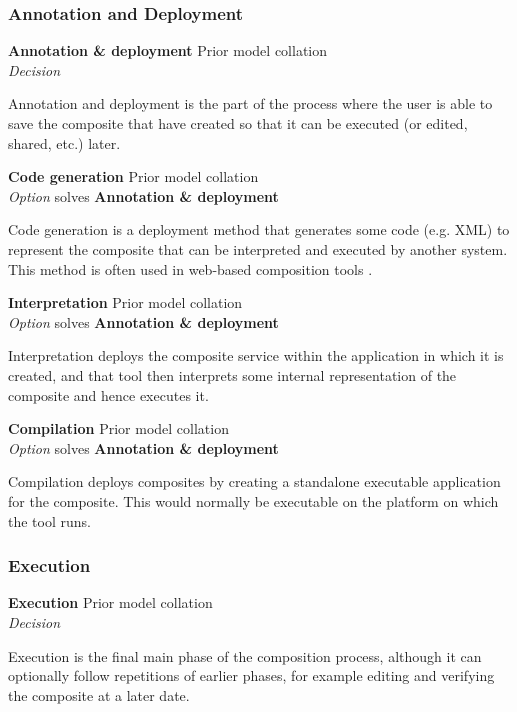 \subsubsection{Annotation and Deployment}

\textbf{Annotation \& deployment} \hfill Prior model collation \cite{Mehandjiev2012} \\ \emph{Decision} \hfill 

Annotation and deployment is the part of the process where the user is able to save the composite that have created so that it can be executed (or edited, shared, etc.) later.

\textbf{Code generation} \hfill Prior model collation \cite{Pietschmann2010} \\ \emph{Option} \hfill solves \textbf{Annotation \& deployment}

Code generation is a deployment method that generates some code (e.g. XML) to represent the composite that can be interpreted and executed by another system. This method is often used in web-based composition tools \cite{Pietschmann2010}.

\textbf{Interpretation} \hfill Prior model collation \cite{Mehandjiev2012} \\ \emph{Option} \hfill solves \textbf{Annotation \& deployment}

Interpretation deploys the composite service within the application in which it is created, and that tool then interprets some internal representation of the composite and hence executes it.

\textbf{Compilation} \hfill Prior model collation \cite{Pietschmann2010} \\ \emph{Option} \hfill solves \textbf{Annotation \& deployment}

Compilation deploys composites by creating a standalone executable application for the composite. This would normally be executable on the platform on which the tool runs.

\subsubsection{Execution}

\textbf{Execution} \hfill Prior model collation \cite{Mehandjiev2012} \\ \emph{Decision} \hfill 

Execution is the final main phase of the composition process, although it can optionally follow repetitions of earlier phases, for example editing and verifying the composite at a later date.

